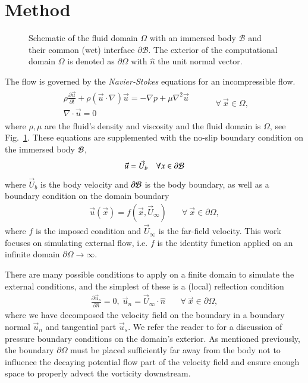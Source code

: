 \documentclass[final,1p,times]{elsarticle}
\begin{document}
\section{Method}

\begin{figure}
    \centering
    \def\svgwidth{0.5\columnwidth}
    
    \caption{Schematic of the fluid domain $\Omega$ with an immersed body $\mathcal{B}$ and their common (wet) interface $\partial\mathcal{B}$. The exterior of the computational domain $\Omega$ is denoted as $\partial\Omega$ with $\hat{n}$ the unit normal vector.}
    \label{Fig_1}
\end{figure}

The flow is governed by the \emph{Navier-Stokes} equations for an incompressible flow. 
\begin{align}
    \begin{array}{c}
     \rho\frac{\partial\vec{u}}{\partial t} +\rho\left(\vec{u}\cdot\nabla\right)\vec{u} = -\nabla p + \mu\nabla^2\vec{u}\\
    \nabla\cdot\vec{u}=0  
    \end{array}
 & \quad\quad\forall\ \vec{x}\in\Omega,
\end{align}
where $\rho,\mu$ are the fluid's density and viscosity and the fluid domain is $\Omega$, see Fig.~\ref{Fig_1}. These equations are supplemented with the no-slip boundary condition on the immersed body $\cal B$,
\begin{equation}
    \vec{u} = \vec{U}_b \quad \forall x \in \partial\cal{B}
\end{equation} 
where $\vec{U}_b$ is the body velocity and $\partial\cal{B}$ is the body boundary, as well as a boundary condition on the domain boundary
\begin{align}
    \vec u(\vec x) = f(\vec x,\vec U_\infty) &\quad\forall\ \vec{x}\in\partial\Omega,
\end{align}
where $f$ is the imposed condition and $\vec U_\infty$ is the far-field velocity. This work focuses on simulating external flow, i.e. $f$ is the identity function applied on an infinite domain $\partial\Omega\rightarrow\infty$.

There are many possible conditions to apply on a finite domain to simulate the external conditions, and the simplest of these is a (local) reflection condition
\begin{align}\label{eq:BC_0}
    \frac{\partial \vec{u}_s}{\partial \hat{n}} = 0,\ \vec{u}_n = \vec U_\infty\cdot \hat n &\quad\forall\ \vec{x}\in\partial\Omega,
\end{align}
where we have decomposed the velocity field on the boundary in a boundary normal $\vec{u}_n$ and tangential part $\vec{u}_s$. We refer the reader to \cite{Gresho1987} for a discussion of pressure boundary conditions on the domain's exterior.  As mentioned previously, the boundary $\partial\Omega$ must be placed sufficiently far away from the body not to influence the decaying potential flow part of the velocity field and ensure enough space to properly advect the vorticity downstream. 
\end{document}
